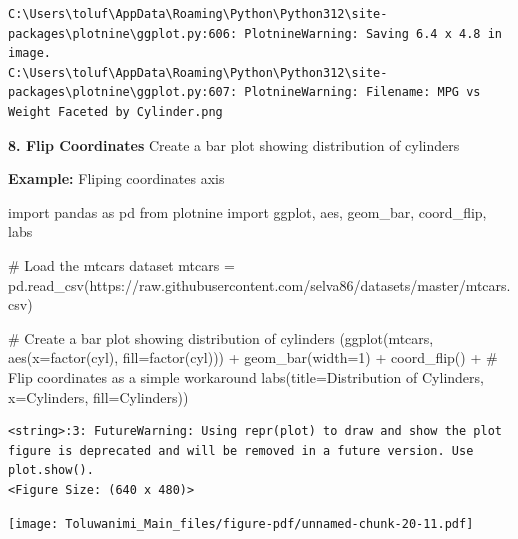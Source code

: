 \documentclass[
  letterpaper,
  DIV=11,
  numbers=noendperiod]{scrreprt}
\newenvironment{Shaded}{\begin{snugshade}}{\end{snugshade}}
\newcommand{\CommentTok}[1]{\textcolor[rgb]{0.37,0.37,0.37}{#1}}
\newcommand{\DecValTok}[1]{\textcolor[rgb]{0.68,0.00,0.00}{#1}}
\newcommand{\ImportTok}[1]{\textcolor[rgb]{0.00,0.46,0.62}{#1}}
\newcommand{\NormalTok}[1]{\textcolor[rgb]{0.00,0.23,0.31}{#1}}
\newcommand{\OperatorTok}[1]{\textcolor[rgb]{0.37,0.37,0.37}{#1}}
\newcommand{\StringTok}[1]{\textcolor[rgb]{0.13,0.47,0.30}{#1}}
\begin{document}
\begin{verbatim}
C:\Users\toluf\AppData\Roaming\Python\Python312\site-packages\plotnine\ggplot.py:606: PlotnineWarning: Saving 6.4 x 4.8 in image.
C:\Users\toluf\AppData\Roaming\Python\Python312\site-packages\plotnine\ggplot.py:607: PlotnineWarning: Filename: MPG vs Weight Faceted by Cylinder.png
\end{verbatim}

\textbf{8. Flip Coordinates} Create a bar plot showing distribution of
cylinders

\textbf{Example:} Fliping coordinates axis

\begin{Shaded}
\begin{Highlighting}[]
\ImportTok{import}\NormalTok{ pandas }\ImportTok{as}\NormalTok{ pd}
\ImportTok{from}\NormalTok{ plotnine }\ImportTok{import}\NormalTok{ ggplot, aes, geom\_bar, coord\_flip, labs}

\CommentTok{\# Load the mtcars dataset}
\NormalTok{mtcars }\OperatorTok{=}\NormalTok{ pd.read\_csv(}\StringTok{\textquotesingle{}https://raw.githubusercontent.com/selva86/datasets/master/mtcars.csv\textquotesingle{}}\NormalTok{)}

\CommentTok{\# Create a bar plot showing distribution of cylinders}
\NormalTok{(ggplot(mtcars, aes(x}\OperatorTok{=}\StringTok{\textquotesingle{}factor(cyl)\textquotesingle{}}\NormalTok{, fill}\OperatorTok{=}\StringTok{\textquotesingle{}factor(cyl)\textquotesingle{}}\NormalTok{)) }\OperatorTok{+}
\NormalTok{ geom\_bar(width}\OperatorTok{=}\DecValTok{1}\NormalTok{) }\OperatorTok{+}
\NormalTok{ coord\_flip() }\OperatorTok{+}  \CommentTok{\# Flip coordinates as a simple workaround}
\NormalTok{ labs(title}\OperatorTok{=}\StringTok{\textquotesingle{}Distribution of Cylinders\textquotesingle{}}\NormalTok{,}
\NormalTok{      x}\OperatorTok{=}\StringTok{\textquotesingle{}Cylinders\textquotesingle{}}\NormalTok{,}
\NormalTok{      fill}\OperatorTok{=}\StringTok{\textquotesingle{}Cylinders\textquotesingle{}}\NormalTok{))}
\end{Highlighting}
\end{Shaded}

\begin{verbatim}
<string>:3: FutureWarning: Using repr(plot) to draw and show the plot figure is deprecated and will be removed in a future version. Use plot.show().
<Figure Size: (640 x 480)>
\end{verbatim}

\texttt{[image: Toluwanimi\_Main\_files/figure-pdf/unnamed-chunk-20-11.pdf]}
\end{document}
